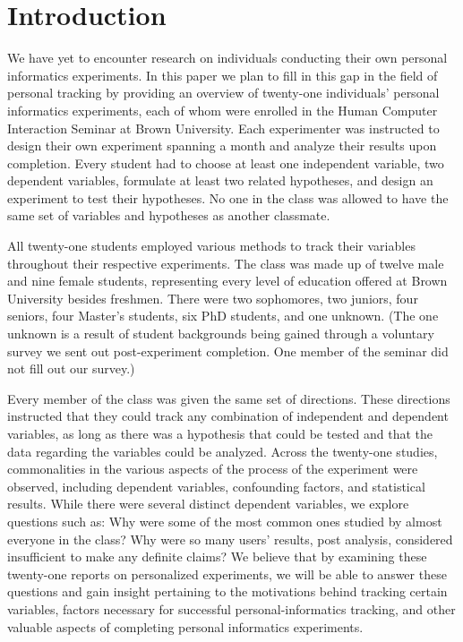 \section{Introduction}
We have yet to encounter research on individuals conducting their own personal informatics experiments. In this paper we plan to fill in this gap in the field of personal tracking by providing an overview of twenty-one individuals' personal informatics experiments, each of whom were enrolled in the Human Computer Interaction Seminar at Brown University. Each experimenter was instructed to design their own experiment spanning a month and analyze their results upon completion. Every student had to choose at least one independent variable, two dependent variables, formulate at least two related hypotheses, and design an experiment to test their hypotheses. No one in the class was allowed to have the same set of variables and hypotheses as another classmate.  
 
All twenty-one students employed various methods to track their variables throughout their respective experiments.  The class was made up of twelve male and nine female students, representing every level of education offered at Brown University besides freshmen.  There were two sophomores, two juniors, four seniors, four Master’s students, six PhD students, and one unknown. (The one unknown is a result of student backgrounds being gained through a voluntary survey we sent out post-experiment completion. One member of the seminar did not fill out our survey.)
 
Every member of the class was given the same set of directions. These directions instructed that they could track any combination of independent and dependent variables, as long as there was a hypothesis that could be tested and that the data regarding the variables could be analyzed. Across the twenty-one studies, commonalities in the various aspects of the process of the experiment were observed, including dependent variables, confounding factors, and statistical results. While there were several distinct dependent variables, we explore questions such as: Why were some of the most common ones studied by almost everyone in the class? Why were so many users' results, post analysis, considered insufficient to make any definite claims? We believe that by examining these twenty-one reports on personalized experiments, we will be able to answer these questions and gain insight pertaining to the motivations behind tracking certain variables, factors necessary for successful personal-informatics tracking, and other valuable aspects of completing personal informatics experiments.